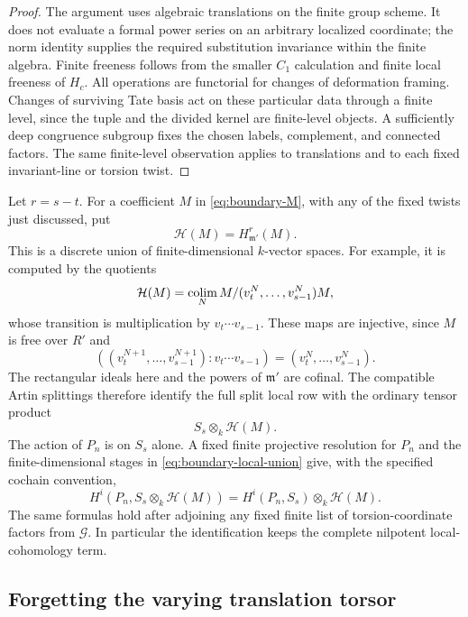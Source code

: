 \begin{proof}
The argument uses algebraic translations on the finite group
scheme.  It does not evaluate a formal power series on an arbitrary
localized coordinate; the norm identity supplies the required
substitution invariance within the finite algebra.  Finite freeness
follows from the smaller $C_1$ calculation and finite local
freeness of $H_c$.  All operations are functorial for changes of
deformation framing.  Changes of surviving Tate basis act on these
particular data through a finite level, since the tuple and the
divided kernel are finite-level objects.  A sufficiently deep
congruence subgroup fixes the chosen labels, complement, and
connected factors.  The same finite-level observation applies to
translations and to each fixed invariant-line or torsion twist.
\end{proof}

Let $r=s-t$.  For a coefficient $M$ in
\eqref{eq:boundary-M}, with any of the fixed twists just discussed,
put
\[
 \mathcal H(M)=H^r_{\mathfrak m'}(M).
\]
This is a discrete union of finite-dimensional $k$-vector spaces.
For example, it is computed by the quotients
\begin{equation}
 \label{eq:boundary-local-union}
 \mathcal H(M)
 =\operatorname*{colim}_{N}
  M/(v_t^N,\ldots,v_{s-1}^N)M,
\end{equation}
whose transition is multiplication by $v_t\cdots v_{s-1}$.
These maps are injective, since $M$ is free over $R'$ and
\[
 ((v_t^{N+1},\ldots,v_{s-1}^{N+1}):v_t\cdots v_{s-1})
    =(v_t^N,\ldots,v_{s-1}^N).
\]
The rectangular ideals here and the powers of $\mathfrak m'$ are
cofinal.  The compatible Artin splittings therefore identify the
full split local row with the ordinary tensor product
\begin{equation}
 \label{eq:boundary-split-local-row}
 S_s\otimes_k\mathcal H(M).
\end{equation}
The action of $P_n$ is on $S_s$ alone.  A fixed finite projective
resolution for $P_n$ and the finite-dimensional stages in
\eqref{eq:boundary-local-union} give, with the specified cochain
convention,
\begin{equation}
 \label{eq:boundary-split-cohomology}
 H^i(P_n,S_s\otimes_k\mathcal H(M))
   =H^i(P_n,S_s)\otimes_k\mathcal H(M).
\end{equation}
The same formulas hold after adjoining any fixed finite list of
torsion-coordinate factors from $\mathcal G$.  In particular the
identification keeps the complete nilpotent local-cohomology term.

\subsection{Forgetting the varying translation torsor}

